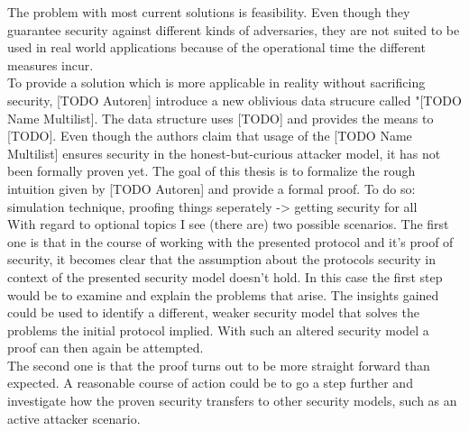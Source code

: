 The problem with most current solutions is feasibility. Even though they guarantee security against different kinds of adversaries, they are not suited to be used in real world applications because of the operational time the different measures incur.\\
To provide a solution which is more applicable in reality without sacrificing security, [TODO Autoren] introduce a new oblivious data strucure called "[TODO Name Multilist]. The data structure uses [TODO] and provides the means to [TODO]. Even though the authors claim that usage of the [TODO Name Multilist] ensures security in the honest-but-curious attacker model, it has not been formally proven yet. The goal of this thesis is to formalize the rough intuition given by [TODO Autoren] and provide a formal proof.
To do so: simulation technique, proofing things seperately -> getting security for all
\ \\With regard to optional topics I see (there are) two possible scenarios. 
The first one is that in the course of working with the presented protocol and it's proof of security, it becomes clear that the assumption about the protocols security in context of the presented security model doesn't hold. In this case the first step would be to examine and explain the problems that arise. The insights gained could be used to identify a different, weaker security model that solves the problems the initial protocol implied. With such an altered security model a proof can then again be attempted.\\
The second one is that the proof turns out to be more straight forward than expected. A reasonable course of action could be to go a step further and investigate how the proven security transfers to other security models, such as an active attacker scenario.

